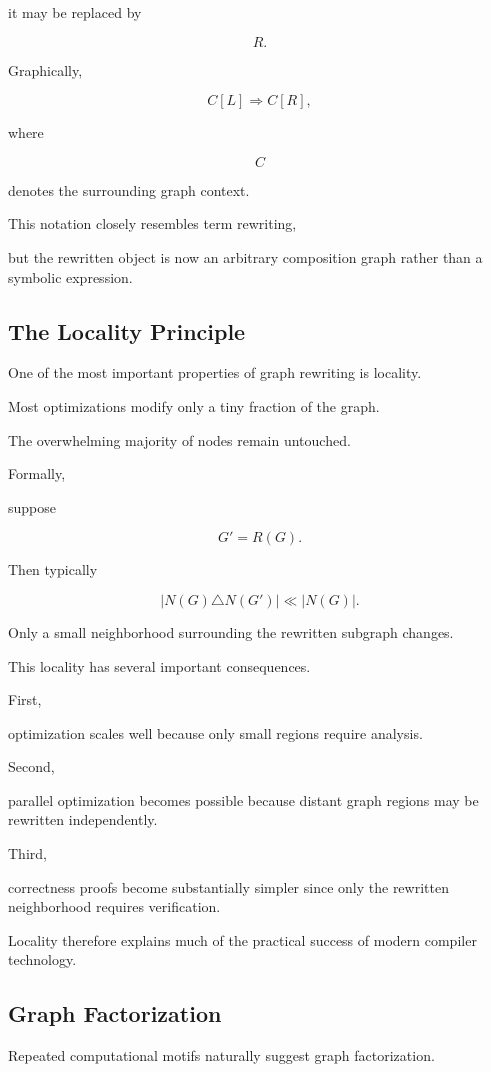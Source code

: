 \documentclass[12pt,oneside]{article}
\begin{document}
it may be replaced by

\[
R.
\]

Graphically,

\[
C[L]
\Longrightarrow
C[R],
\]

where

\[
C
\]

denotes the surrounding graph context.

This notation closely resembles term rewriting,

but the rewritten object is now an arbitrary composition graph rather than a symbolic expression.

\subsection{The Locality Principle}

One of the most important properties of graph rewriting is locality.

Most optimizations modify only a tiny fraction of the graph.

The overwhelming majority of nodes remain untouched.

Formally,

suppose

\[
G'
=
R(G).
\]

Then typically

\[
|N(G)\triangle N(G')|
\ll
|N(G)|.
\]

Only a small neighborhood surrounding the rewritten subgraph changes.

This locality has several important consequences.

First,

optimization scales well because only small regions require analysis.

Second,

parallel optimization becomes possible because distant graph regions may be rewritten independently.

Third,

correctness proofs become substantially simpler since only the rewritten neighborhood requires verification.

Locality therefore explains much of the practical success of modern compiler technology.

\subsection{Graph Factorization}

Repeated computational motifs naturally suggest graph factorization.
\end{document}
